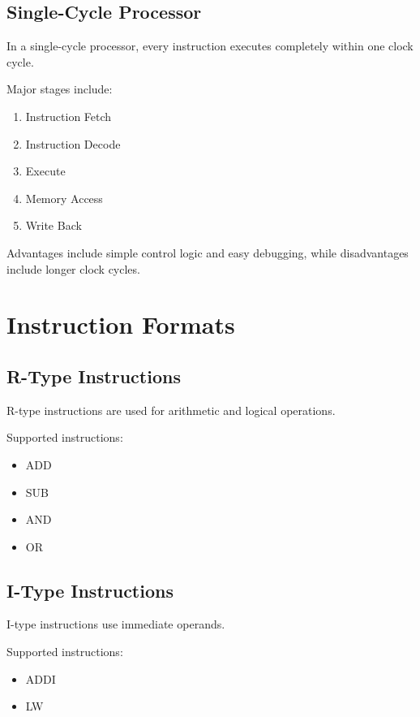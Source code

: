 \documentclass[conference]{IEEEtran}
\begin{document}
\subsection{Single-Cycle Processor}

In a single-cycle processor, every instruction executes completely within one clock cycle.

Major stages include:

\begin{enumerate}
    \item Instruction Fetch
    \item Instruction Decode
    \item Execute
    \item Memory Access
    \item Write Back
\end{enumerate}

Advantages include simple control logic and easy debugging, while disadvantages include longer clock cycles.


\section{Instruction Formats}

\subsection{R-Type Instructions}

R-type instructions are used for arithmetic and logical operations.

Supported instructions:

\begin{itemize}
    \item ADD
    \item SUB
    \item AND
    \item OR
\end{itemize}

\subsection{I-Type Instructions}

I-type instructions use immediate operands.

Supported instructions:

\begin{itemize}
    \item ADDI
    \item LW
\end{itemize}
\end{document}
